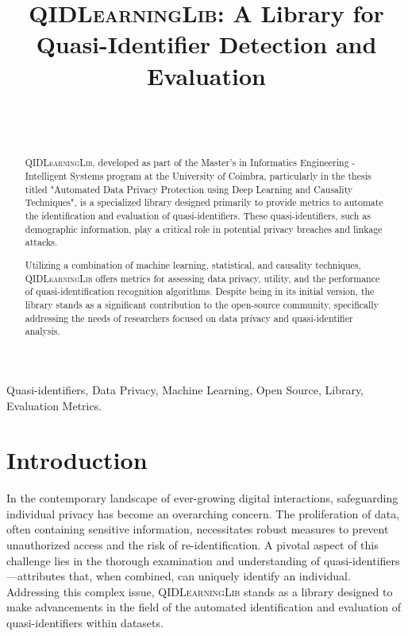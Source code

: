 \documentclass[twoside,11pt]{article}
\begin{document}
\title{\textsc{QIDLearningLib}: A Library for Quasi-Identifier Detection and Evaluation}

\author{ \\
        \\
       }



\maketitle

\begin{abstract}
\textsc{QIDLearningLib}, developed as part of the Master's in Informatics Engineering - Intelligent Systems program at the University of Coimbra, particularly in the thesis titled "Automated Data Privacy Protection using Deep Learning and Causality Techniques", is a specialized library designed primarily to provide metrics to automate the identification and evaluation of quasi-identifiers. These quasi-identifiers, such as demographic information, play a critical role in potential privacy breaches and linkage attacks.

Utilizing a combination of machine learning, statistical, and causality techniques, \textsc{QIDLearningLib} offers metrics for assessing data privacy, utility, and the performance of quasi-identification recognition algorithms. Despite being in its initial version, the library stands as a significant contribution to the open-source community, specifically addressing the needs of researchers focused on data privacy and quasi-identifier analysis.
\end{abstract}

\begin{keywords}
Quasi-identifiers, Data Privacy, Machine Learning, Open Source, Library, Evaluation Metrics.
\end{keywords}

\section{Introduction}
In the contemporary landscape of ever-growing digital interactions, safeguarding individual privacy has become an overarching concern. The proliferation of data, often containing sensitive information, necessitates robust measures to prevent unauthorized access and the risk of re-identification. A pivotal aspect of this challenge lies in the thorough examination and understanding of quasi-identifiers—attributes that, when combined, can uniquely identify an individual. Addressing this complex issue, \textsc{QIDLearningLib} stands as a library designed to make advancements in the field of the automated identification and evaluation of quasi-identifiers within datasets.
\end{document}
